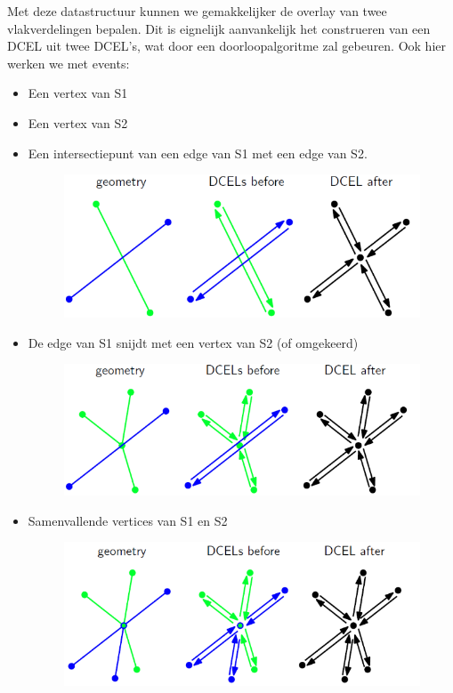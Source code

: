 \documentclass[12pt,a4paper]{article}
\begin{document}
	Met deze datastructuur kunnen we gemakkelijker de overlay van twee vlakverdelingen bepalen. Dit is eignelijk aanvankelijk het construeren van een DCEL uit twee DCEL's, wat door een doorloopalgoritme zal gebeuren. Ook hier werken we met events: 
	\begin{itemize}
		\item Een vertex van S1
		\item Een vertex van S2
		\item Een intersectiepunt van een edge van S1 met een edge van S2. 
		\begin{figure}[H]
			\centering
			\includegraphics[width=0.7\linewidth]{afbeeldingen/intersection-DCEL}
			\label{fig:intersection-dcel}
		\end{figure}
		\item De edge van S1 snijdt met een vertex van S2 (of omgekeerd)
		\begin{figure}[H]
			\centering
			\includegraphics[width=0.7\linewidth]{afbeeldingen/DCEL-vertex&edge}
			\label{fig:dcel-vertexedge}
		\end{figure}
		\item Samenvallende vertices van S1 en S2
		\begin{figure}[H]
			\centering
			\includegraphics[width=0.7\linewidth]{afbeeldingen/DCEL-vertices}
			\label{fig:dcel-vertices}
		\end{figure}
	\end{itemize}
\end{document}
